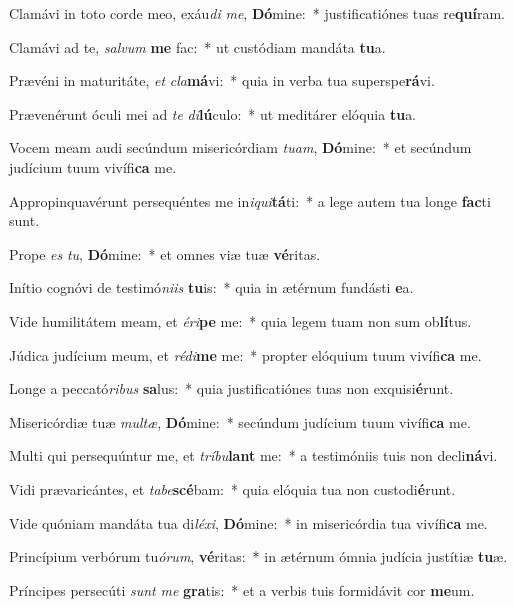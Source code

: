 \item Clamávi in toto corde meo, exáu\textit{di} \textit{me}, \textbf{Dó}mine:~* justificatiónes tuas re\textbf{quí}ram.
\item Clamávi ad te, \textit{sal}\textit{vum} \textbf{me} fac:~* ut custódiam mandáta \textbf{tu}a.
\item Prævéni in maturitáte, \textit{et} \textit{cla}\textbf{má}vi:~* quia in verba tua superspe\textbf{rá}vi.
\item Prævenérunt óculi mei ad \textit{te} \textit{di}\textbf{lú}culo:~* ut meditárer elóquia \textbf{tu}a.
\item Vocem meam audi secúndum misericórdiam \textit{tu}\textit{am}, \textbf{Dó}mine:~* et secúndum judícium tuum vivífi\textbf{ca} me.
\item Appropinquavérunt persequéntes me in\textit{i}\textit{qui}\textbf{tá}ti:~* a lege autem tua longe \textbf{fac}ti sunt.
\item Prope \textit{es} \textit{tu}, \textbf{Dó}mine:~* et omnes viæ tuæ \textbf{vé}ritas.
\item Inítio cognóvi de testimó\textit{ni}\textit{is} \textbf{tu}is:~* quia in ætérnum fundásti \textbf{e}a.
\item Vide humilitátem meam, et \textit{é}\textit{ri}\textbf{pe} me:~* quia legem tuam non sum ob\textbf{lí}tus.
\item Júdica judícium meum, et \textit{réd}\textit{i}\textbf{me} me:~* propter elóquium tuum vivífi\textbf{ca} me.
\item Longe a peccató\textit{ri}\textit{bus} \textbf{sa}lus:~* quia justificatiónes tuas non exquisi\textbf{é}runt.
\item Misericórdiæ tuæ \textit{mul}\textit{tæ}, \textbf{Dó}mine:~* secúndum judícium tuum vivífi\textbf{ca} me.
\item Multi qui persequúntur me, et \textit{trí}\textit{bu}\textbf{lant} me:~* a testimóniis tuis non decli\textbf{ná}vi.
\item Vidi prævaricántes, et \textit{ta}\textit{be}\textbf{scé}bam:~* quia elóquia tua non custodi\textbf{é}runt.
\item Vide quóniam mandáta tua di\textit{lé}\textit{xi}, \textbf{Dó}mine:~* in misericórdia tua vivífi\textbf{ca} me.
\item Princípium verbórum tu\textit{ó}\textit{rum}, \textbf{vé}ritas:~* in ætérnum ómnia judícia justítiæ \textbf{tu}æ.
\item Príncipes persecúti \textit{sunt} \textit{me} \textbf{gra}tis:~* et a verbis tuis formidávit cor \textbf{me}um.
